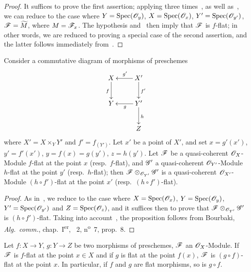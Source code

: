 \begin{proof}
It suffices to prove the first assertion; applying three times~, as well as~, we can reduce to the case where $Y=\operatorname{Spec}(\mathscr{O}_y)$, $X=\operatorname{Spec}(\mathscr{O}_x)$, $Y'=\operatorname{Spec}(\mathscr{O}_{y'})$, $\mathscr{F}=\widetilde{M}$, where $M=\mathscr{F}_x$.
The hypothesis and~ then imply that $\mathscr{F}$ is $f$-flat; in other words, we are reduced to proving a special case of the second assertion, and the latter follows immediately from~.
\end{proof}

\begin{proposition}[2.1.5]
\label{IV.2.1.5}
Consider a commutative diagram of morphisms of preschemes
\[
\xymatrix{
  X \ar[d]_f & X' \ar[l]_{g'} \ar[d]^{f'} \\
  Y & Y' \ar[l]^g \ar[d]^h \\
  & Z
}
\]
where $X'=X\times_Y Y'$ and $f'=f_{(Y')}$.
Let $x'$ be a point of $X'$, and set $x=g'(x')$, $y'=f'(x')$, $y=f(x)=g(y')$, $z=h(y')$.
Let $\mathscr{F}$ be a quasi-coherent $\mathscr{O}_X$-Module $f$-flat at the point $x$ \textnormal{(resp.}\ $f$-flat\textnormal{)}, and $\mathscr{G}'$ a quasi-coherent $\mathscr{O}_{Y'}$-Module $h$-flat at the point $y'$ \textnormal{(resp.}\ $h$-flat\textnormal{)}; then $\mathscr{F}\otimes_{\mathscr{O}_{Y'}}\mathscr{G}'$ is a quasi-coherent $\mathscr{O}_{X'}$-Module $(h\circ f')$-flat at the point $x'$ \textnormal{(resp.}\ $(h\circ f')$-flat\textnormal{)}.
\end{proposition}

\begin{proof}
As in~, we reduce to the case where $X=\operatorname{Spec}(\mathscr{O}_x)$, $Y=\operatorname{Spec}(\mathscr{O}_y)$,
$Y'=\operatorname{Spec}(\mathscr{O}_{y'})$ and $Z=\operatorname{Spec}(\mathscr{O}_z)$, and it suffices then to prove that $\mathscr{F}\otimes_{\mathscr{O}_{Y'}}\mathscr{G}'$ is $(h\circ f')$-flat.
Taking into account~, the proposition follows from Bourbaki, \emph{Alg.~comm.}, chap.~I\textsuperscript{er}, \textsection~2, n\textsuperscript{o}~7, prop.~8.
\end{proof}

\begin{corollary}[2.1.6]
\label{IV.2.1.6}
Let $f:X\to Y$, $g:Y\to Z$ be two morphisms of preschemes, $\mathscr{F}$ an $\mathscr{O}_X$-Module. If $\mathscr{F}$ is $f$-flat at the point $x\in X$ and if $g$ is flat at the point $f(x)$, $\mathscr{F}$ is $(g\circ f)$-flat at the point $x$.
In particular, if $f$ and $g$ are flat morphisms, so is $g\circ f$.
\end{corollary}


